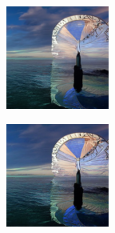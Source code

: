 \documentclass{article}
\begin{document}
\begin{figure}
\begin{subfigure}[b]{0.5\linewidth}
\begin{subfigure}[b]{0.242\linewidth}
        \end{subfigure}%
        \begin{subfigure}[b]{0.242\linewidth}
        \includegraphics[width=\linewidth]{figures/imagenet128/solver_samples/imagenet128_fm_ot_204_20.png}
        \end{subfigure}%
        \begin{subfigure}[b]{0.242\linewidth}
        \includegraphics[width=\linewidth]{figures/imagenet128/solver_samples/imagenet128_fm_ot_204_50.png}

\end{subfigure}
\end{subfigure}
\end{figure}
\end{document}
